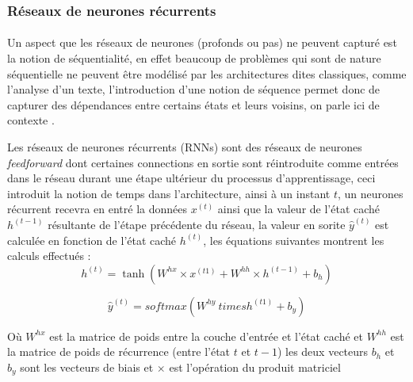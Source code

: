 		\subsubsection{Réseaux de neurones récurrents}\label{seq2seqpart2}
		\paragraph{}
		Un aspect que les réseaux de neurones (profonds ou pas) ne peuvent capturé est la notion de séquentialité, en effet beaucoup de problèmes qui sont de nature séquentielle ne peuvent être modélisé par les architectures dites classiques, comme l'analyse d'un texte, l'introduction d'une notion de séquence permet donc de capturer des dépendances entre certains états et leurs voisins, on parle ici de contexte \cite{rnn_lstms}.
		\par 
		Les réseaux de neurones récurrents (RNNs) sont des réseaux de neurones \textit{feedforward} dont certaines connections en sortie sont réintroduite comme entrées dans le réseau durant une étape ultérieur du processus d'apprentissage, ceci introduit la notion de temps dans l'architecture, ainsi à un instant $t$, un neurones récurrent recevra en entré la données $x^{(t)}$ ainsi que la valeur de l'état caché $h^{(t-1)}$ résultante de l'étape précédente du réseau, la valeur en sorite $\hat{y}^{(t)}$ est calculée en fonction de l'état caché $h^{(t)}$, les équations suivantes montrent les calculs effectués :
		\begin{equation}
			h^{(t)} = \tanh(W^{hx} \times x^{(t1)} + W^{hh} \times h^{(t-1)} + b_h)
		\end{equation}
		
		\begin{equation}
			\hat{y}^{(t)} = softmax(W^{hy} \ times h^{(t1)} + b_y)
		\end{equation}
		
		Où $W^{hx}$ est la matrice de poids entre la couche d'entrée et l'état caché et $W^{hh}$ est la matrice de poids de récurrence (entre l'état $t$ et $t-1$) les deux vecteurs $b_h$ et $b_y$ sont les vecteurs de biais et $\times$ est l'opération du produit matriciel\cite{rnn_lstms}
		
